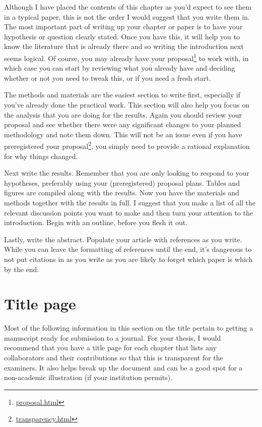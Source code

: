 \documentclass[
]{krantz}
\renewcommand{\href}[2]{#2\footnote{\url{#1}}}
\begin{document}
Although I have placed the contents of this chapter as you'd expect to see them in a typical paper, this is not the order I would suggest that you write them in. The most important part of writing up your chapter or paper is to have your hypothesis or question clearly stated. Once you have this, it will help you to know the literature that is already there and so writing the introduction next seems logical. Of course, you may already have \href{proposal.html}{your proposal} to work with, in which case you can start by reviewing what you already have and deciding whether or not you need to tweak this, or if you need a fresh start.

The methods and materials are the easiest section to write first, especially if you've already done the practical work. This section will also help you focus on the analysis that you are doing for the results. Again you should review your proposal and see whether there were any significant changes to your planned methodology and note them down. This will not be an issue even if you have \href{transparency.html}{preregistered your proposal}, you simply need to provide a rational explanation for why things changed.

Next write the results. Remember that you are only looking to respond to your hypotheses, preferably using your (preregistered) proposal plans. Tables and figures are compiled along with the results. Now you have the materials and methods together with the results in full. I suggest that you make a list of all the relevant discussion points you want to make and then turn your attention to the introduction. Begin with an outline, before you flesh it out.

Lastly, write the abstract. Populate your article with references as you write. While you can leave the formatting of references until the end, it's dangerous to not put citations in as you write as you are likely to forget which paper is which by the end.

\hypertarget{title}{%
\section{Title page}\label{title}}

Most of the following information in this section on the title pertain to getting a manuscript ready for submission to a journal. For your thesis, I would recommend that you have a title page for each chapter that lists any collaborators and their contributions so that this is transparent for the examiners. It also helps break up the document and can be a good spot for a non-academic illustration (if your institution permits).
\end{document}
